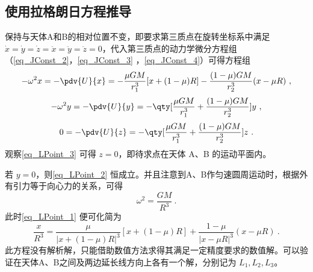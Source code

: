 



\subsection{使用拉格朗日方程推导}

保持与天体A和B的相对位置不变，即要求第三质点在旋转坐标系中满足 $\dot{x}=\dot{y}=\dot{z}=\ddot{x}=\ddot{y}=\ddot{z}=0$，代入第三质点的动力学微分方程组（\autoref{eq_JConst_2}，\autoref{eq_JConst_3}  ，\autoref{eq_JConst_4}）可得方程组
\begin{equation}\label{eq_LPoint_1}
-\omega^2 x =- \pdv{U}{x}=-\frac{\mu GM}{r_1^3}[x+(1-\mu)R]-\frac{(1-\mu)GM}{r_2^3}(x-\mu R)~,
\end{equation}
\begin{equation}\label{eq_LPoint_2}
-\omega^2 y =- \pdv{U}{y}=-\qty[\frac{\mu GM}{r_1^3}+\frac{(1-\mu)GM}{r_2^3}]y~,
\end{equation}
\begin{equation}\label{eq_LPoint_3}
0 =- \pdv{U}{z} =-\qty[\frac{\mu GM}{r_1^3}+\frac{(1-\mu)GM}{r_2^3}]z~.
\end{equation}
观察\autoref{eq_LPoint_3} 可得 $z=0$，即待求点在天体 A、B 的运动平面内。

若 $y=0$，则\autoref{eq_LPoint_2} 恒成立。并且注意到A、B作匀速圆周运动时，根据外有引力等于向心力的关系，可得
\begin{equation}%
\omega^2 =\frac{GM}{R^3}~.
\end{equation}
此时\autoref{eq_LPoint_1} 便可化简为
\begin{equation}%
\frac{x}{R^3} =\frac{\mu}{|x+(1-\mu)R|^3}[x+(1-\mu)R]+\frac{1-\mu}{|x-\mu R|^3}(x-\mu R)~.
\end{equation}
此方程没有解析解，只能借助数值方法求得其满足一定精度要求的数值解。可以验证在天体A、B之间及两边延长线方向上各有一个解，分别记为 $L_1,L_2,L_3$。

